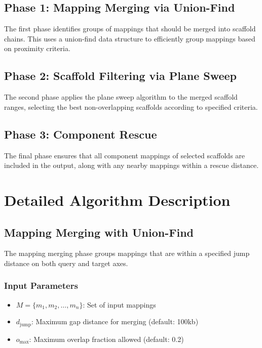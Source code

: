\documentclass[11pt]{article}
\begin{document}
\subsection{Phase 1: Mapping Merging via Union-Find}

The first phase identifies groups of mappings that should be merged into scaffold chains. This uses a union-find data structure to efficiently group mappings based on proximity criteria.

\subsection{Phase 2: Scaffold Filtering via Plane Sweep}

The second phase applies the plane sweep algorithm to the merged scaffold ranges, selecting the best non-overlapping scaffolds according to specified criteria.

\subsection{Phase 3: Component Rescue}

The final phase ensures that all component mappings of selected scaffolds are included in the output, along with any nearby mappings within a rescue distance.

\section{Detailed Algorithm Description}

\subsection{Mapping Merging with Union-Find}

The mapping merging phase groups mappings that are within a specified jump distance on both query and target axes.

\subsubsection{Input Parameters}
\begin{itemize}
    \item $M = \{m_1, m_2, \ldots, m_n\}$: Set of input mappings
    \item $d_{\text{jump}}$: Maximum gap distance for merging (default: 100kb)
    \item $o_{\text{max}}$: Maximum overlap fraction allowed (default: 0.2)
\end{itemize}
\end{document}
